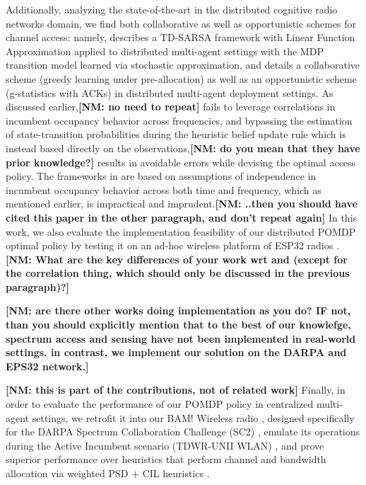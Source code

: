 \documentclass[12pt, draftcls, onecolumn]{IEEEtran}
\newcommand{\nm}[1]{{\color{blue}\bf{[NM: #1]}}}
\begin{document}
Additionally, analyzing the state-of-the-art in the distributed cognitive radio networks domain, we find both collaborative as well as opportunistic schemes for channel access: namely, \cite{WCL:5} describes a TD-SARSA framework with Linear Function Approximation applied to distributed multi-agent settings with the MDP transition model learned via stochastic approximation, and \cite{WCL:MIT} details a collaborative scheme (greedy learning under pre-allocation) as well as an opportunistic scheme (g-statistics with ACKs) in distributed multi-agent deployment settings. As discussed earlier,\nm{no need to repeat} \cite{WCL:5} fails to leverage correlations in incumbent occupancy behavior across frequencies, and bypassing the estimation of state-transition probabilities during the heuristic belief update rule which is instead based directly on the observations,\nm{do you mean that they have prior knowledge?} results in avoidable errors while devising the optimal access policy. The frameworks in \cite{WCL:MIT} are based on assumptions of independence in incumbent occupancy behavior across both time and frequency, which as mentioned earlier, is impractical and imprudent.\nm{..then you should have cited this paper in the other paragraph, and don't repeat again}
 In this work, we also evaluate the implementation feasibility of our distributed POMDP optimal policy by testing it on an ad-hoc wireless platform of ESP32 radios \cite{GCTronic:epuck2, Espressif:ESP32}. 
 \nm{What are the key differences of your work wrt  \cite{WCL:5} and  \cite{WCL:MIT} (except for the correlation thing, which should only be discussed in the previous paragraph)?}
 
 \nm{are there other works doing implementation as you do? IF not, than you should explicitly mention that to the best of our knowlefge, spectrum access and sensing have not been implemented in
 real-world settings. in contrast, we implement our solution on the DARPA and EPS32 network.}


\nm{this is part of the contributions, not of related work}
Finally, in order to evaluate the performance of our POMDP policy in centralized multi-agent settings, we retrofit it into our BAM! Wireless radio \cite{BAM}, designed specifically for the DARPA Spectrum Collaboration Challenge (SC2) \cite{DARPA:SC2, DARPA:SC2scenarios}, emulate its operations during the Active Incumbent scenario (TDWR-UNII WLAN) \cite{DARPA:ActiveIncumbent}, and prove superior performance over heuristics that perform channel and bandwidth allocation via weighted PSD + CIL heuristics \cite{DARPA:CIL, DARPASC2:end1, DARPASC2:end2, DARPASC2:end3, DARPASC2:end4}.
\end{document}
